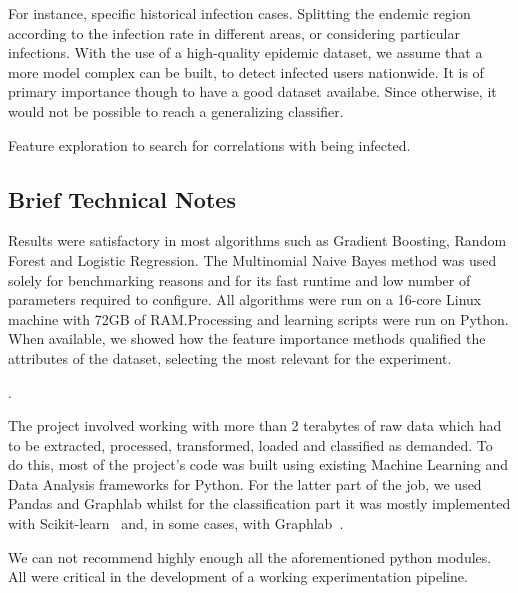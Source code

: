 \begin{description}
    \item [Search for epidemiological data at a detailed level.] For instance, specific historical infection cases.
    Splitting the endemic region according to the infection rate in different areas, or considering particular infections.
    With the use of a high-quality epidemic dataset, we assume that a more model complex can be built, to detect infected users nationwide.
    It is of primary importance though to have a good dataset availabe.
    Since otherwise, it would not be possible to reach a generalizing classifier.

    \item Feature exploration to search for correlations with being infected.

\end{description}



\subsection{Brief Technical Notes }


Results were satisfactory in most algorithms such as Gradient Boosting, Random Forest and Logistic Regression.
The Multinomial Naive Bayes method was used solely for benchmarking reasons and for its fast runtime and low number of parameters required to configure.
All algorithms were run on a 16-core Linux machine with 72GB of RAM.\@ Processing and learning scripts were run on Python.
When available, we showed how the feature importance methods qualified the attributes of the dataset, selecting the most relevant for the experiment.

.

The project involved working with more than 2 terabytes of raw data which had to be extracted, processed, transformed, loaded and classified as demanded.
To do this, most of the project's code was built using existing Machine Learning and Data Analysis frameworks for Python.
For the latter part of the job, we used Pandas and Graphlab whilst for the classification part it was mostly implemented with Scikit-learn~\textcite{scikit-learn} and, in some cases, with Graphlab~\textcite{graphlab}.

We can not recommend highly enough all the aforementioned python modules.
All were critical in the development of a working experimentation pipeline.




